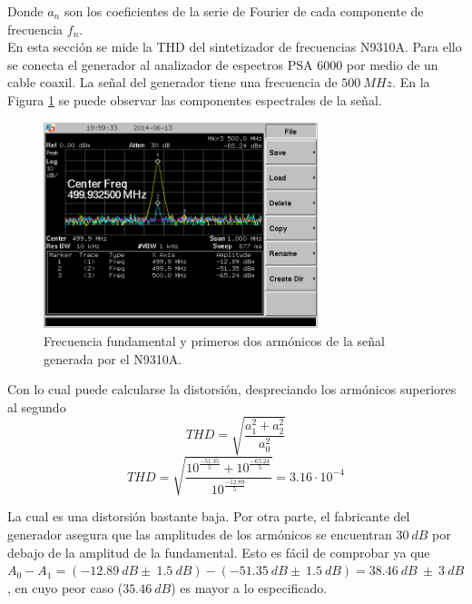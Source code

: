 \documentclass[a4paper,10pt]{article}
\begin{document}
		\indent Donde $a_n$ son los coeficientes de la serie de Fourier de cada 
		componente de frecuencia $f_n$. \\
		\indent En esta secci\'on se mide la THD del sintetizador de frecuencias  
		N9310A. Para ello se conecta el generador al analizador de espectros PSA
		6000 por medio de un cable coaxil. La se\~nal del generador tiene una 
		frecuencia de $500~MHz$. En la Figura \ref{THD} se puede observar las 
		componentes espectrales de la se\~nal.
		
		\begin{figure}[!htb]
				\centering
				\includegraphics[width=8cm]
				{Imagenes/SCREN445.png}
				\caption{Frecuencia fundamental y primeros dos arm\'onicos de la
				se\~nal generada por el N9310A.}
				\label{THD} 
		\end{figure}
		
		\indent Con lo cual puede calcularse la distorsi\'on, despreciando los 
		arm\'onicos superiores al segundo
		$$THD=\sqrt{\frac{a^2_1+a^2_2}{a^2_0}}$$
		$$THD=\sqrt{\frac{10^{\frac{-51.35}{5}}+10^{\frac{-65.24}{5}}}{10^{
		\frac{-12.89}{5}}}}=3.16\cdot10^{-4}$$
		
		
		\indent La cual es una distorsi\'on bastante baja. Por otra parte, el 
		fabricante del generador asegura que las amplitudes de los arm\'onicos 
		se encuentran $30~dB$ por debajo de la amplitud de la fundamental. Esto 
		es f\'acil de comprobar ya que 
		$A_0-A_1=(-12.89~dB\pm~1.5~dB)-(-51.35~dB\pm~1.5~dB)=38.46~dB~\pm~3~dB$,
		en cuyo peor caso ($35.46~dB$) es mayor a lo especificado.
		
\end{document}
